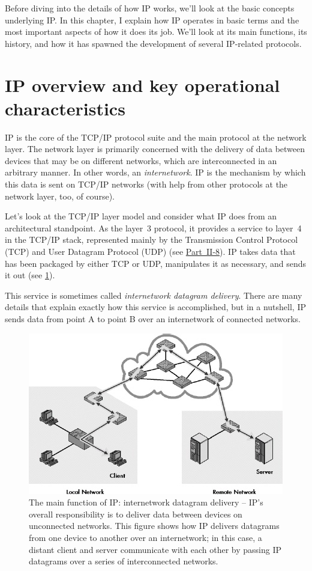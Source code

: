 \documentclass[b5paper,11pt]{memoir}
\begin{document}
Before diving into the details of how IP works, we'll look at the basic
concepts underlying IP. In this chapter, I explain how IP operates in
basic terms and the most important aspects of how it does its job. We'll
look at its main functions, its history, and how it has spawned the
development of several IP-related protocols.



\section{IP overview and key operational characteristics}

IP is the core of the TCP/IP protocol suite and the main protocol at the network layer.
The network layer is primarily concerned with the delivery of data between devices that may be on different networks, which are
interconnected in an arbitrary manner.
In other words, an {\emph{internetwork}}.
IP is the mechanism by which this data is sent on TCP/IP networks (with help from other protocols at the network layer, too, of course).

Let's look at the TCP/IP layer model and consider what IP does from an
architectural standpoint. As the layer~3 protocol, it provides a service
to layer~4 in the TCP/IP stack, represented mainly by the Transmission
Control Protocol (TCP) and User Datagram Protocol (UDP) (see
\protect\hyperlink{pt11.html}{Part~II-8}).
IP takes data that has been packaged by either TCP or UDP, manipulates it as necessary, and sends it out (see \cref{fig:ip-main-function}).

This service is sometimes called {\emph{internetwork datagram delivery}}.
There are many details that explain exactly how this service is accomplished, but in a nutshell, IP sends data from point A to point B over an internetwork of connected networks.


\begin{figure}
   \centering
   \includegraphics[width=.7\textwidth]{images/ip-main-function.jpg}
   \caption{The main function of IP: internetwork datagram delivery -- IP's overall responsibility is to deliver data between devices on unconnected networks. This figure shows how IP delivers datagrams from one device to another over an internetwork; in this case, a distant client and server communicate with each other by passing IP datagrams over a series of interconnected networks.}
   \label{fig:ip-main-function}
\end{figure}
\end{document}
